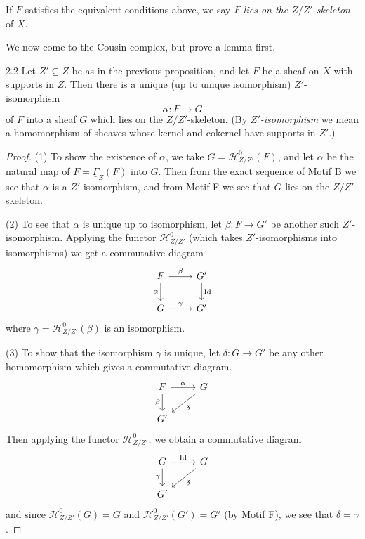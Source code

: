 \begin{definition*}
If $F$ satisfies the equivalent conditions above, we say $F$ \emph{lies on the $Z/Z'$-skeleton} of $X$.
\end{definition*}

We now come to the Cousin complex, but prove a lemma first.

\begin{booklemma}{2.2}\label{lem:4.2.2}
Let $Z'\subseteq Z$ be as in the previous proposition, and let $F$ be a sheaf on $X$ with supports in $Z$. Then there is a unique (up to unique isomorphism) $Z'$-isomorphism
\[
\alpha\colon F\longrightarrow G
\]
of $F$ into a sheaf $G$ which lies on the $Z/Z'$-skeleton. (By \emph{$Z'$-isomorphism} we mean a homomorphism of sheaves whose kernel and cokernel have supports in $Z'$.)
\end{booklemma}

\begin{proof}
(1) To show the existence of $\alpha$, we take $G=\mathcal{H}_{Z/Z'}^{0}(F)$, and let $\alpha$ be the natural map of $F=\underline{\Gamma}_Z(F)$ into $G$. Then from the exact sequence of Motif B we see that $\alpha$ is a $Z'$-isomorphism, and from Motif F we see that $G$ lies on the $Z/Z'$-skeleton.

(2) To see that $\alpha$ is unique up to isomorphism, let $\beta\colon F\to G'$ be another such $Z'$-isomorphism. Applying the functor $\mathcal{H}_{Z/Z'}^{0}$ (which takes $Z'$-isomorphisms into isomorphisms) we get a commutative diagram
\[
\begin{tikzcd}
F \arrow[r, "\beta"] \arrow[d, "\alpha"'] & G' \arrow[d, "\operatorname{Id}"] \\
G \arrow[r, "\gamma"] & G'
\end{tikzcd}
\]
where $\gamma=\mathcal{H}_{Z/Z'}^{0}(\beta)$ is an isomorphism.

(3) To show that the isomorphism $\gamma$ is unique, let $\delta\colon G\to G'$ be any other homomorphism which gives a commutative diagram.
\[
\begin{tikzcd}
	F \arrow[r, "\alpha"] \arrow[d, "\beta"'] & G \arrow[dl, "\delta"] \\
	G'
\end{tikzcd}
\]
Then applying the functor $\mathcal{H}_{Z/Z'}^{0}$, we obtain a commutative diagram
\[
\begin{tikzcd}
	G \arrow[r, "\operatorname{Id}"] \arrow[d, "\gamma"'] & G \arrow[dl, "\delta"] \\
	G'
\end{tikzcd}
\]
and since $\mathcal{H}_{Z/Z'}^{0}(G)=G$ and $\mathcal{H}_{Z/Z'}^{0}(G')=G'$ (by Motif F), we see that $\delta=\gamma$.
\end{proof}

